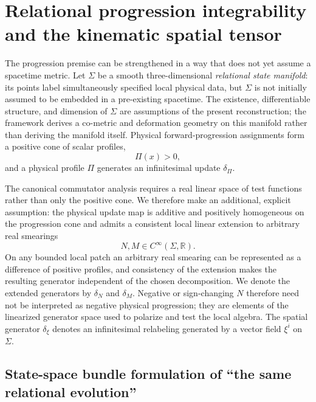 \documentclass[11pt]{article}
\begin{document}
\section{Relational progression integrability and the kinematic spatial tensor}
\label{sec:path_independence}

The progression premise can be strengthened in a way that does not yet assume a spacetime metric. Let $\Sigma$ be a smooth three-dimensional \emph{relational state manifold}: its points label simultaneously specified local physical data, but $\Sigma$ is not initially assumed to be embedded in a pre-existing spacetime. The existence, differentiable structure, and dimension of $\Sigma$ are assumptions of the present reconstruction; the framework derives a co-metric and deformation geometry on this manifold rather than deriving the manifold itself. Physical forward-progression assignments form a positive cone of scalar profiles,
\begin{equation}
    \Pi(x)>0,
\end{equation}
and a physical profile $\Pi$ generates an infinitesimal update $\delta_{\Pi}$.

The canonical commutator analysis requires a real linear space of test functions rather than only the positive cone. We therefore make an additional, explicit assumption: the physical update map is additive and positively homogeneous on the progression cone and admits a consistent local linear extension to arbitrary real smearings
\begin{equation}
    N,M\in C^\infty(\Sigma,\mathbb R).
    \label{eq:linear_extension_smearings}
\end{equation}
On any bounded local patch an arbitrary real smearing can be represented as a difference of positive profiles, and consistency of the extension makes the resulting generator independent of the chosen decomposition. We denote the extended generators by $\delta_N$ and $\delta_M$. Negative or sign-changing $N$ therefore need not be interpreted as negative physical progression; they are elements of the linearized generator space used to polarize and test the local algebra. The spatial generator $\delta_\xi$ denotes an infinitesimal relabeling generated by a vector field $\xi^i$ on $\Sigma$.

\subsection{State-space bundle formulation of ``the same relational evolution''}
\end{document}
